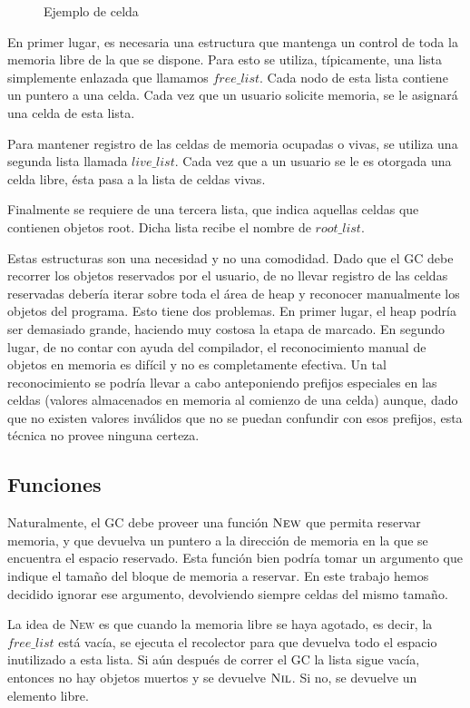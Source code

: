 \begin{figure}[h]
\label{fig:cell}
\centering

\caption{Ejemplo de celda}
\end{figure}

En primer lugar, es necesaria una estructura que mantenga un control de toda la memoria libre de la que se dispone. Para esto se utiliza, típicamente, una lista simplemente enlazada que llamamos $free\_list$. Cada nodo de esta lista contiene un puntero a una celda. Cada vez que un usuario solicite memoria, se le asignará una celda de esta lista.

Para mantener registro de las celdas de memoria ocupadas o vivas, se utiliza una segunda lista llamada $live\_list$. Cada vez que a un usuario se le es otorgada una celda libre, ésta pasa a la lista de celdas vivas.

Finalmente se requiere de una tercera lista, que indica aquellas celdas que contienen objetos root. Dicha lista recibe el nombre de $root\_list$.

Estas estructuras son una necesidad y no una comodidad. Dado que el GC debe recorrer los objetos reservados por el usuario, de no llevar registro de las celdas reservadas debería iterar sobre toda el área de heap y reconocer manualmente los objetos del programa. Esto tiene dos problemas. En primer lugar, el heap podría ser demasiado grande, haciendo muy costosa la etapa de marcado. En segundo lugar, de no contar con ayuda del compilador, el reconocimiento manual de objetos en memoria es difícil y no es completamente efectiva. Un tal reconocimiento se podría llevar a cabo anteponiendo prefijos especiales en las celdas (valores almacenados en memoria al comienzo de una celda) aunque, dado que no existen valores inválidos que no se puedan confundir con esos prefijos, esta técnica no provee ninguna certeza.

\subsection{Funciones}
Naturalmente, el GC debe proveer una función $\textsc{New}$ que permita reservar memoria, y que devuelva un puntero a la dirección de memoria en la que se encuentra el espacio reservado. Esta función bien podría tomar un argumento que indique el tamaño del bloque de memoria a reservar. En este trabajo hemos decidido ignorar ese argumento, devolviendo siempre celdas del mismo tamaño.

La idea de \textsc{New} es que cuando la memoria libre se haya agotado, es decir, la $free\_list$ está vacía, se ejecuta el recolector para que devuelva todo el espacio inutilizado a esta lista. Si aún después de correr el GC la lista sigue vacía, entonces no hay objetos muertos y se devuelve $\textsc{Nil}$. Si no, se devuelve un elemento libre. 

